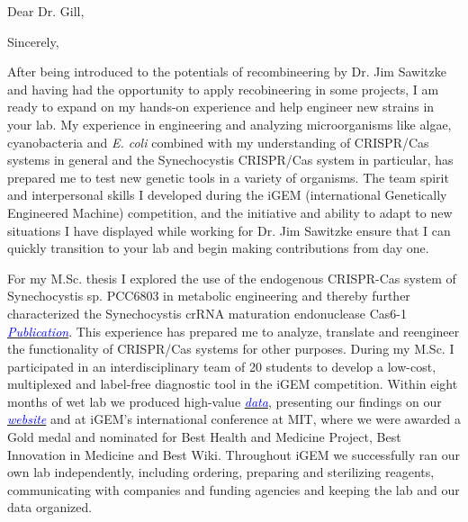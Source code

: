 \documentclass[11pt,a4paper,sans]{moderncv}
\begin{document}
\thispagestyle{titlepage}
\date{\today}
\opening{Dear Dr. Gill,}
\closing{Sincerely,}
\makelettertitle
\begin{spacing}{1.1}

After being introduced to the potentials of recombineering by Dr. Jim Sawitzke and having had the opportunity to apply recobineering in some projects, I am ready to expand on my hands-on experience and help engineer new strains in your lab. %
My experience in engineering and analyzing microorganisms like algae, cyanobacteria and \textit{E. coli} combined with my understanding of CRISPR/Cas systems in general and the Synechocystis CRISPR/Cas system in particular, has prepared me to test new genetic tools in a variety of organisms.
The team spirit and interpersonal skills I developed during the iGEM (international Genetically Engineered Machine) competition, and the initiative and ability to adapt to new situations I have displayed while working for Dr. Jim Sawitzke ensure that I can quickly transition to your lab and begin making contributions from day one.\par%

For my M.Sc. thesis I explored the use of the endogenous CRISPR-Cas system of Synechocystis sp. PCC6803 in metabolic engineering and thereby further characterized the Synechocystis crRNA maturation endonuclease Cas6-1
{\href{https://www.tandfonline.com/eprint/vmAQ3vjYGdZIZpIKQTIT/full}{\textcolor{blue}{{\textit{Publication}}}}}.
This experience has prepared me to analyze, translate and reengineer the functionality of CRISPR/Cas systems for other purposes. 
During my M.Sc. I participated in an interdisciplinary team of 20 students to develop a low-cost, multiplexed and label-free diagnostic tool in the iGEM competition.
Within eight months of wet lab we produced high-value {\href{https://www.ncbi.nlm.nih.gov/pubmed/29803867}{\textcolor{blue}{\textit{data}}}}, presenting our findings on our 
{\href{http://2015.igem.org/Team:Freiburg/Home_Intro}{\textcolor{blue}{\textit{website}}}} and at iGEM's international conference at MIT, where we were awarded a Gold medal and nominated for Best Health and Medicine Project, Best Innovation in Medicine and Best Wiki.
Throughout iGEM we successfully ran our own lab independently, including ordering, preparing and sterilizing reagents, communicating with companies and funding agencies and keeping the lab and our data organized. \par


\end{spacing}
\end{document}
